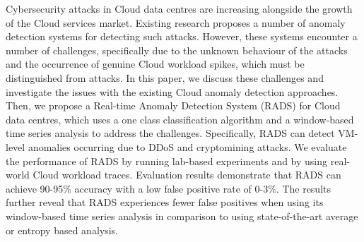 Cybersecurity attacks in Cloud data centres are increasing alongside the growth of the Cloud services market. 
Existing research proposes a number of anomaly detection systems for detecting such attacks. 
However, these systems encounter a number of challenges, specifically due to the unknown behaviour of the attacks and the occurrence of genuine Cloud workload spikes, which must be distinguished from attacks. 
In this paper, we discuss these challenges and investigate the issues with the existing Cloud anomaly detection approaches. Then, we propose a Real-time Anomaly Detection System (RADS) for Cloud data centres, which uses a one class classification algorithm and a window-based time series analysis to address the challenges. 
Specifically, RADS can detect VM-level anomalies occurring due to DDoS and cryptomining attacks.
We evaluate the performance of RADS by running lab-based experiments and by using real-world Cloud workload traces. %
Evaluation results demonstrate that RADS can achieve 90-95\% accuracy with a low false positive rate of 0-3\%.
The results further reveal that RADS experiences fewer false positives when using its window-based time series analysis in comparison to using state-of-the-art average or entropy based analysis.


